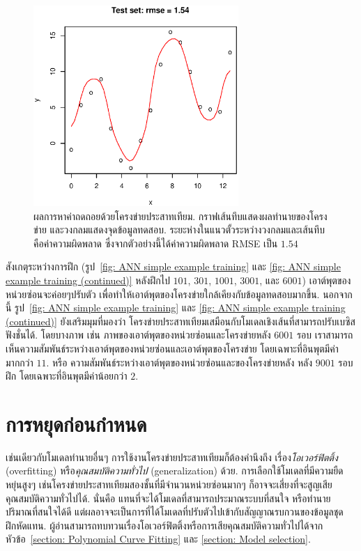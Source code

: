%
\begin{figure}
\begin{center}
\includegraphics[height=3in]{04ANN/testResults.eps}
\end{center}
\caption{ผลการหาค่าถดถอยด้วยโครงข่ายประสาทเทียม.
กราฟเส้นทึบแสดงผลทำนายของโครงข่าย และวงกลมแสดงจุดข้อมูลทดสอบ.
ระยะห่างในแนวตั้วระหว่างวงกลมและเส้นทึบ คือค่าความผิดพลาด ซึ่งจากตัวอย่างนี้ได้ค่าความผิดพลาด RMSE เป็น $1.54$}
\label{fig: ANN simple example results}
\end{figure}
%

สังเกตุระหว่างการฝึก (รูป~\ref{fig: ANN simple example training} และ \ref{fig: ANN simple example training (continued)} หลังฝึกไป $101$, $301$, $1001$, $3001$, และ $6001$) เอาต์พุตของหน่วยซ่อนจะค่อยๆปรับตัว 
เพื่อทำให้เอาต์พุตของโครงข่ายใกล้เคียงกับข้อมูลทดสอบมากขึ้น.
นอกจากนี้ รูป~\ref{fig: ANN simple example training} และ \ref{fig: ANN simple example training (continued)} ยังเสริมมุมที่มองว่า โครงข่ายประสาทเทียมเสมือนกับโมเดลเชิงเส้นที่สามารถปรับเบซิสฟังชั่นได้.
โดยบางภาพ เช่น ภาพของเอาต์พุตของหน่วยซ่อนและโครงข่ายหลัง $6001$ รอบ เราสามารถเห็นความสัมพันธ์ระหว่างเอาต์พุตของหน่วยซ่อนและเอาต์พุตของโครงข่าย โดยเฉพาะที่อินพุตมีค่ามากกว่า $11$.
หรือ ความสัมพันธ์ระหว่างเอาต์พุตของหน่วยซ่อนและของโครงข่ายหลัง หลัง $9001$ รอบฝึก โดยเฉพาะที่อินพุตมีค่าน้อยกว่า $2$.

\section*{การหยุดก่อนกำหนด}
\label{sec: ann early stopping}

เช่นเดียวกับโมเดลทำนายอื่นๆ %
การใช้งานโครงข่ายประสาทเทียมก็ต้องคำนึงถึง เรื่อง\textit{โอเวอร์ฟิตติ้ง} (overfitting) หรือ\textit{คุณสมบัติความทั่วไป} (generalization) ด้วย.
การเลือกใช้โมเดลที่มีความยืดหยุ่นสูงๆ เช่นโครงข่ายประสาทเทียมสองชั้นที่มีจำนวนหน่วยซ่อนมากๆ ก็อาจจะเสี่ยงที่จะสูญเสียคุณสมบัติความทั่วไปได้. 
นั่นคือ แทนที่จะได้โมเดลที่สามารถประมาณระบบที่สนใจ หรือทำนายปริมาณที่สนใจได้ดี แต่ผลอาจจะเป็นการที่ได้โมเดลที่ปรับตัวไปเข้ากับสัญญาณรบกวนของข้อมูลชุดฝึกหัดแทน.
ผู้อ่านสามารถทบทวนเรื่องโอเวอร์ฟิตติ้งหรือการเสียคุณสมบัติความทั่วไปได้จากหัวข้อ~\ref{section: Polynomial Curve Fitting} และ \ref{section: Model selection}.

